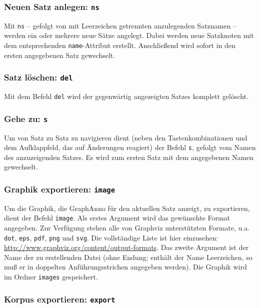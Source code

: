 \documentclass[12pt]{scrartcl}
\begin{document}
\subsubsection{Neuen Satz anlegen: \texttt{ns}}\label{befehl-ns}

Mit \texttt{ns} – gefolgt von mit Leerzeichen getrennten anzulegenden Satznamen – werden ein oder mehrere neue Sätze angelegt. Dabei werden neue Satzknoten mit dem entsprechenden \texttt{name}-Attribut erstellt. Anschließend wird sofort in den ersten angegebenen Satz gewechselt.


\subsubsection{Satz löschen: \texttt{del}}

Mit dem Befehl \texttt{del} wird der gegenwärtig angezeigten Satzes komplett gelöscht.


\subsubsection{Gehe zu: \texttt{s}}

Um von Satz zu Satz zu navigieren dient (neben den Tastenkombinationen und dem Aufklappfeld, das auf Änderungen reagiert) der Befehl \texttt{s}, gefolgt vom Namen des anzuzeigenden Satzes. Es wird zum ersten Satz mit dem angegebenen Namen gewechselt.


\subsubsection{Graphik exportieren: \texttt{image}}

Um die Graphik, die GraphAnno für den aktuellen Satz anzeigt, zu exportieren, dient der Befehl \texttt{image}. Als erstes Argument wird das gewünschte Format angegeben. Zur Verfügung stehen alle von Graphviz unterstützten Formate, u.a. \texttt{dot}, \texttt{eps}, \texttt{pdf}, \texttt{png} und \texttt{svg}. Die vollständige Liste ist hier einzusehen: \url{http://www.graphviz.org/content/output-formats}. Das zweite Argument ist der Name der zu erstellenden Datei (ohne Endung; enthält der Name Leerzeichen, so muß er in doppelten Anführungsstrichen angegeben werden). Die Graphik wird im Ordner \texttt{images} gespeichert.


\subsubsection{Korpus exportieren: \texttt{export}}\label{befehl-export}
\end{document}
